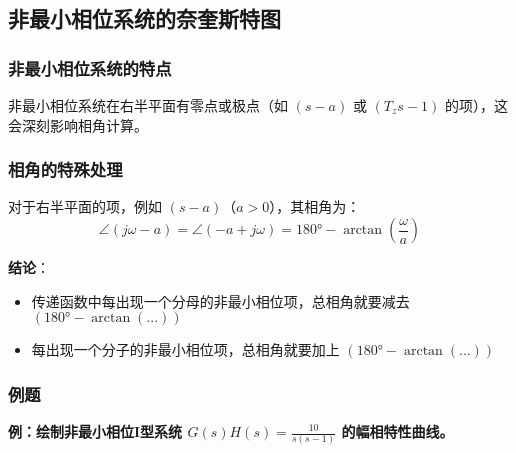 \subsection{非最小相位系统的奈奎斯特图}

\subsubsection{非最小相位系统的特点}

非最小相位系统在右半平面有零点或极点（如 $(s-a)$ 或 $(T_zs-1)$ 的项），这会深刻影响相角计算。

\subsubsection{相角的特殊处理}

对于右半平面的项，例如 $(s-a)$（$a > 0$），其相角为：
\[\angle(j\omega-a) = \angle(-a+j\omega) = 180° - \arctan(\frac{\omega}{a})\]

\textbf{结论}：
\begin{itemize}
    \item 传递函数中每出现一个分母的非最小相位项，总相角就要减去 $(180° - \arctan(...))$
    \item 每出现一个分子的非最小相位项，总相角就要加上 $(180° - \arctan(...))$
\end{itemize}

\subsubsection{例题}

\textbf{例：绘制非最小相位I型系统 $G(s)H(s) = \frac{10}{s(s-1)}$ 的幅相特性曲线。}

